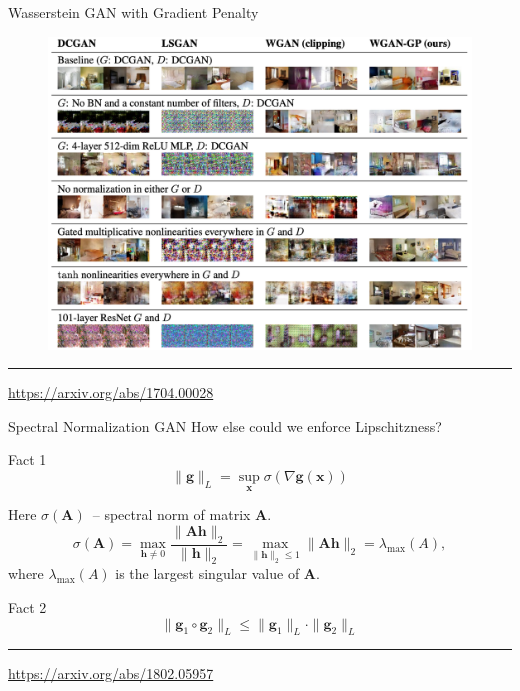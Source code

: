 \documentclass{beamer}
\newcommand{\bh}{\mathbf{h}}
\newcommand{\bx}{\mathbf{x}}
\newcommand{\bA}{\mathbf{A}}
\begin{document}
\begin{frame}{Wasserstein GAN with Gradient Penalty}
	\begin{figure}
		\centering
		\includegraphics[width=0.95\linewidth]{figs/wgan_gp_results}
	\end{figure}
	\vfill
	\hrule\medskip 
	{\scriptsize \href{https://arxiv.org/abs/1704.00028}{https://arxiv.org/abs/1704.00028}}
	
\end{frame}
\begin{frame}{Spectral Normalization GAN}
	How else could we enforce Lipschitzness?
	\begin{block}{Fact 1}
		\vspace{-0.3cm}
		\[
			\| \mathbf{g} \|_L = \sup_\bx \sigma( \nabla \mathbf{g}(\bx))
		\]
	\end{block}
	Here $\sigma(\bA)$~-- spectral norm of matrix $\bA$.
	\[
		\sigma(\bA) = \max_{\bh \neq 0} \frac{\|\bA \bh\|_2}{\|\bh\|_2} = \max_{\|\bh\|_2 \leq 1} \| \bA \bh \|_2 = \lambda_{\text{max}}(A),
	\]
	where $\lambda_{\text{max}}(A)$ is the largest singular value of $\bA$.
	\begin{block}{Fact 2}
		\vspace{-0.3cm}
		\[
			\| \mathbf{g}_1 \circ \mathbf{g}_2 \|_L \leq \| \mathbf{g}_1 \|_L \cdot \| \mathbf{g}_2\|_L
		\]
	\end{block}
	\vfill
	\hrule\medskip 
	{\scriptsize \href{https://arxiv.org/abs/1802.05957}{https://arxiv.org/abs/1802.05957}}
	
\end{frame}
\end{document}
